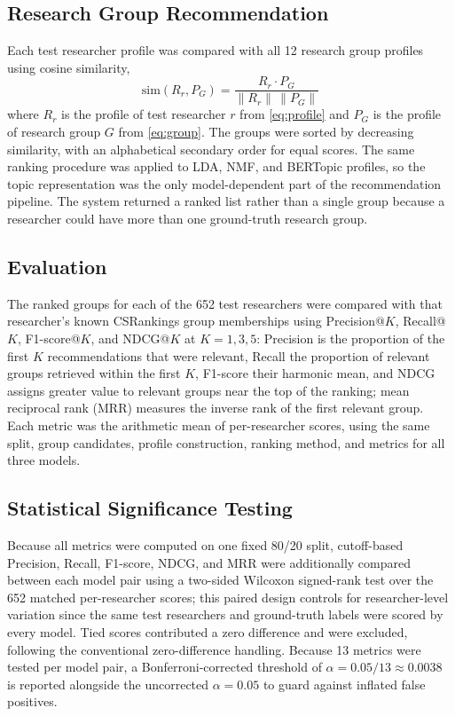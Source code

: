 \subsection{Research Group Recommendation}
Each test researcher profile was compared with all 12 research group profiles using cosine similarity,
\begin{equation}
\mathrm{sim}(R_r, P_G) = \frac{R_r \cdot P_G}{\lVert R_r \rVert \, \lVert P_G \rVert}
\label{eq:cosine}
\end{equation}
where $R_r$ is the profile of test researcher $r$ from \eqref{eq:profile} and $P_G$ is the profile of research group $G$ from \eqref{eq:group}. The groups were sorted by decreasing similarity, with an alphabetical secondary order for equal scores. The same ranking procedure was applied to LDA, NMF, and BERTopic profiles, so the topic representation was the only model-dependent part of the recommendation pipeline. The system returned a ranked list rather than a single group because a researcher could have more than one ground-truth research group.

\subsection{Evaluation}
The ranked groups for each of the 652 test researchers were compared with that researcher's known CSRankings group memberships using Precision@$K$, Recall@$K$, F1-score@$K$, and NDCG@$K$ at $K=1,3,5$: Precision is the proportion of the first $K$ recommendations that were relevant, Recall the proportion of relevant groups retrieved within the first $K$, F1-score their harmonic mean, and NDCG assigns greater value to relevant groups near the top of the ranking; mean reciprocal rank (MRR) measures the inverse rank of the first relevant group. Each metric was the arithmetic mean of per-researcher scores, using the same split, group candidates, profile construction, ranking method, and metrics for all three models.

\subsection{Statistical Significance Testing}
\label{sec:sigtest}
Because all metrics were computed on one fixed 80/20 split, cutoff-based Precision, Recall, F1-score, NDCG, and MRR were additionally compared between each model pair using a two-sided Wilcoxon signed-rank test over the 652 matched per-researcher scores; this paired design controls for researcher-level variation since the same test researchers and ground-truth labels were scored by every model. Tied scores contributed a zero difference and were excluded, following the conventional zero-difference handling. Because 13 metrics were tested per model pair, a Bonferroni-corrected threshold of $\alpha = 0.05/13 \approx 0.0038$ is reported alongside the uncorrected $\alpha = 0.05$ to guard against inflated false positives.
